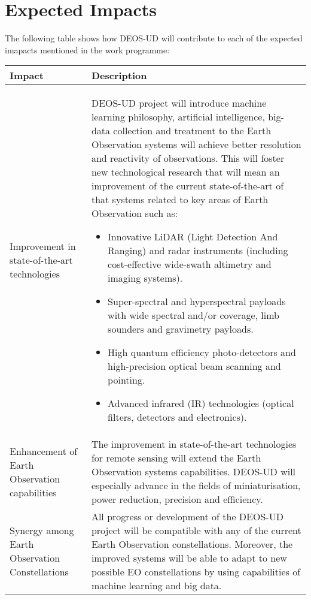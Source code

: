 \section{Expected Impacts}

The following table shows how DEOS-UD will contribute to each of the expected imapacts mentioned in the work programme:

\begin{longtable}{p{3cm} p{11cm}}
	
	\toprule[2pt]
	
	\textbf{Impact} &  \textbf{Description}\\
	
	\midrule [1.5pt]
	Improvement in state-of-the-art technologies & DEOS-UD project will introduce machine learning philosophy, artificial intelligence, big-data collection and treatment to the Earth Observation systems will achieve better resolution and reactivity of observations. This will foster new technological research that will mean an improvement of the current state-of-the-art of that systems related to key areas of Earth Observation such as: 
	\begin{itemize}  
		\item Innovative LiDAR (Light Detection And Ranging) and radar instruments (including cost-effective wide-swath altimetry and imaging systems).
		\item Super-spectral and hyperspectral payloads with wide spectral and/or coverage, limb sounders and gravimetry payloads.
		\item High quantum efficiency photo-detectors and high-precision optical beam scanning and pointing.
		\item Advanced infrared (IR) technologies (optical filters, detectors and electronics).
	\end{itemize}
	\vspace{0.2cm}\\
	
	\midrule
	
	Enhancement of Earth Observation capabilities & The improvement in state-of-the-art technologies for remote sensing will extend the Earth Observation systems capabilities. DEOS-UD will especially advance in the fields of miniaturisation, power reduction, precision and efficiency.\vspace{0.2cm}\\
	
	\midrule
	
	Synergy among Earth Observation Constellations & All progress or development of the DEOS-UD project will be compatible with any of the current Earth Observation constellations. Moreover, the improved systems will be able to adapt to new possible EO constellations by using capabilities of machine learning and big data.\vspace{0.2cm}\\
	

\end{longtable}
